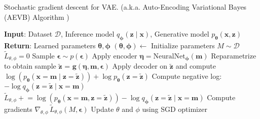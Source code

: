 \begin{algorithm}[H]
    \caption[SGD for VAE]{Stochastic gradient descent for VAE. (a.k.a. Auto-Encoding Variational Bayes (AEVB) Algorithm )}
    \label{alg:sgd}
    \begin{algorithmic}[1]
    \State \textbf{Input}: Dataset $\mathcal{D}$, Inference model $q_{\boldsymbol{\phi}}(\mathbf{z}\mid \mathbf{x})$, Generative model $p_{\boldsymbol{\theta}}(\mathbf{x},\mathbf{z})$
    \State \textbf{Return}: Learned parameters $\boldsymbol{\theta}, \boldsymbol{\phi}$
    \State $(\boldsymbol{\theta}, \boldsymbol{\phi}) \leftarrow$ Initialize parameters
    \State $M \sim \mathcal{D}$ 
    \State $\tilde{L}_{\theta,\phi} = 0$
        \State Sample $\boldsymbol{\epsilon} \sim p(\boldsymbol{\epsilon})$ 
        \State Apply encoder $\boldsymbol{\eta} = \mathrm{NeuralNet}_{\boldsymbol{\phi}}(\boldsymbol{m})$
        \State Reparametrize to obtain sample $\tilde{\boldsymbol{z}}$ = $\boldsymbol{g}(\boldsymbol{\eta},\boldsymbol{m},\boldsymbol{\epsilon})$ 
        \State Apply decoder on $\tilde{\boldsymbol{z}}$ and compute $\log(p_{\boldsymbol{\theta}}(\mathbf{x}=\boldsymbol{m}\mid \mathbf{z}=\tilde{\boldsymbol{z}})) + \log p_{\boldsymbol{\theta}}(\boldsymbol{z}=\tilde{\boldsymbol{z}})$
        \State Compute negative log: $-\log q_{\boldsymbol{\phi}}(\boldsymbol{z}=\tilde{\boldsymbol{z}}\mid \boldsymbol{x}=\boldsymbol{m})$ 
        \State $\tilde{L}_{\theta,\phi} \mathrel{+}= \log(p_{\boldsymbol{\theta}}(\mathbf{x}=\boldsymbol{m},\mathbf{z}=\tilde{\boldsymbol{z}})) - \log q_{\boldsymbol{\phi}}(\boldsymbol{z}=\tilde{\boldsymbol{z}}\mid \boldsymbol{x}=\boldsymbol{m})$ 
    \EndFor
    \State Compute gradients $\nabla_{\theta,\phi} \,\tilde{L}_{\theta,\phi}(M, \boldsymbol{\epsilon})$
    \State Update $\theta$ and $\phi$ using SGD optimizer
    \EndWhile
    \end{algorithmic}
\end{algorithm}

